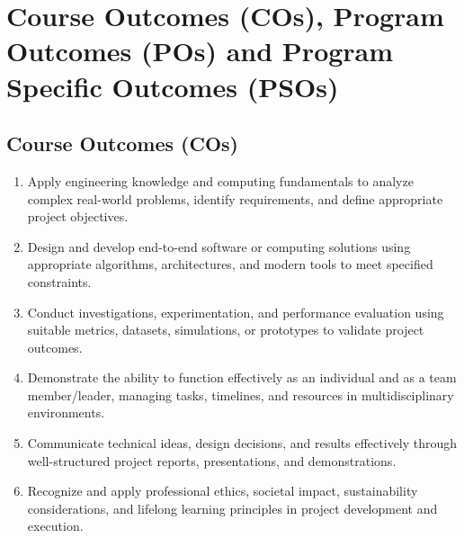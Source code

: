 \documentclass[12pt,a4paper]{report}
\begin{document}
\section*{Course Outcomes (COs), Program Outcomes (POs) and Program Specific Outcomes (PSOs)}


\subsection*{Course Outcomes (COs)}
\begin{enumerate}[leftmargin=3em]
	\item[\textbf{CO1:}] Apply engineering knowledge and computing fundamentals to analyze complex real-world problems, identify requirements, and define appropriate project objectives.
	\item[\textbf{CO2:}] Design and develop end-to-end software or computing solutions using appropriate algorithms, architectures, and modern tools to meet specified constraints.
	\item[\textbf{CO3:}] Conduct investigations, experimentation, and performance evaluation using suitable metrics, datasets, simulations, or prototypes to validate project outcomes.
	\item[\textbf{CO4:}] Demonstrate the ability to function effectively as an individual and as a team member/leader, managing tasks, timelines, and resources in multidisciplinary environments.
	\item[\textbf{CO5:}] Communicate technical ideas, design decisions, and results effectively through well-structured project reports, presentations, and demonstrations.
	\item[\textbf{CO6:}] Recognize and apply professional ethics, societal impact, sustainability considerations, and lifelong learning principles in project development and execution.
\end{enumerate}
\end{document}
